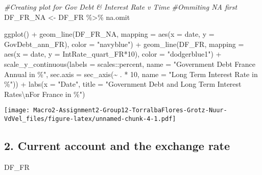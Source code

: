 \documentclass[
]{article}
\newenvironment{Shaded}{\begin{snugshade}}{\end{snugshade}}
\newcommand{\AttributeTok}[1]{\textcolor[rgb]{0.77,0.63,0.00}{#1}}
\newcommand{\CommentTok}[1]{\textcolor[rgb]{0.56,0.35,0.01}{\textit{#1}}}
\newcommand{\DecValTok}[1]{\textcolor[rgb]{0.00,0.00,0.81}{#1}}
\newcommand{\FunctionTok}[1]{\textcolor[rgb]{0.00,0.00,0.00}{#1}}
\newcommand{\NormalTok}[1]{#1}
\newcommand{\OtherTok}[1]{\textcolor[rgb]{0.56,0.35,0.01}{#1}}
\newcommand{\SpecialCharTok}[1]{\textcolor[rgb]{0.00,0.00,0.00}{#1}}
\newcommand{\StringTok}[1]{\textcolor[rgb]{0.31,0.60,0.02}{#1}}
\begin{document}
\begin{Shaded}
\begin{Highlighting}[]
\CommentTok{\#Creating plot for Gov Debt \& Interest Rate v Time}
\CommentTok{\#Ommiting NA first}
\NormalTok{DF\_FR\_NA }\OtherTok{\textless{}{-}}\NormalTok{ DF\_FR }\SpecialCharTok{\%\textgreater{}\%}
\NormalTok{  na.omit}

\FunctionTok{ggplot}\NormalTok{() }\SpecialCharTok{+} 
  \FunctionTok{geom\_line}\NormalTok{(DF\_FR\_NA, }\AttributeTok{mapping =} \FunctionTok{aes}\NormalTok{(}\AttributeTok{x =}\NormalTok{ date, }\AttributeTok{y =}\NormalTok{ GovDebt\_ann\_FR), }\AttributeTok{color =} \StringTok{"navyblue"}\NormalTok{) }\SpecialCharTok{+}
  \FunctionTok{geom\_line}\NormalTok{(DF\_FR, }\AttributeTok{mapping =} \FunctionTok{aes}\NormalTok{(}\AttributeTok{x =}\NormalTok{ date, }\AttributeTok{y =}\NormalTok{ IntRate\_quart\_FR}\SpecialCharTok{*}\DecValTok{10}\NormalTok{), }\AttributeTok{color =} \StringTok{"dodgerblue1"}\NormalTok{) }\SpecialCharTok{+}
  \FunctionTok{scale\_y\_continuous}\NormalTok{(}\AttributeTok{labels =}\NormalTok{ scales}\SpecialCharTok{::}\NormalTok{percent, }\AttributeTok{name =} \StringTok{"Government Debt France Annual in \%"}\NormalTok{, }\AttributeTok{sec.axis =} \FunctionTok{sec\_axis}\NormalTok{(}\SpecialCharTok{\textasciitilde{}}\NormalTok{ . }\SpecialCharTok{*} \DecValTok{10}\NormalTok{, }\AttributeTok{name =} \StringTok{"Long Term Interest Rate in \%"}\NormalTok{)) }\SpecialCharTok{+}
  \FunctionTok{labs}\NormalTok{(}\AttributeTok{x =} \StringTok{"Date"}\NormalTok{, }\AttributeTok{title =} \StringTok{"Government Debt and Long Term Interest Rates}\SpecialCharTok{\textbackslash{}n}\StringTok{For France in \%"}\NormalTok{)}
\end{Highlighting}
\end{Shaded}

\texttt{[image: Macro2-Assignment2-Group12-TorralbaFlores-Grotz-Nuur-VdVel\_files/figure-latex/unnamed-chunk-4-1.pdf]}

\hypertarget{current-account-and-the-exchange-rate}{%
\subsection{2. Current account and the exchange
rate}\label{current-account-and-the-exchange-rate}}

\begin{Shaded}
\begin{Highlighting}[]
\NormalTok{DF\_FR}
\end{Highlighting}
\end{Shaded}
\end{document}
